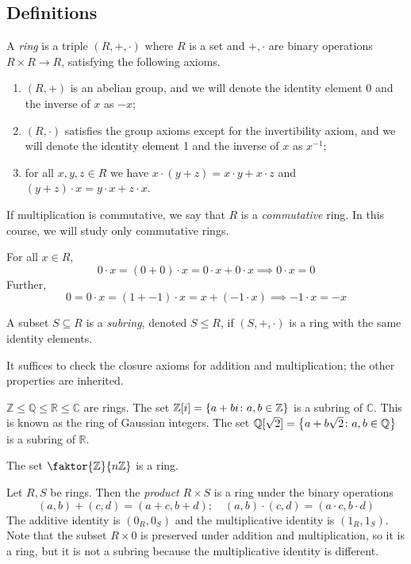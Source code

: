 \subsection{Definitions}
\begin{definition}
	A \textit{ring} is a triple \( (R, +, \cdot) \) where \( R \) is a set and \( +, \cdot \) are binary operations \( R \times R \to R \), satisfying the following axioms.
	\begin{enumerate}
		\item \( (R, +) \) is an abelian group, and we will denote the identity element 0 and the inverse of \( x \) as \( -x \);
		\item \( (R, \cdot) \) satisfies the group axioms except for the invertibility axiom, and we will denote the identity element 1 and the inverse of \( x \) as \( x^{-1} \);
		\item for all \( x, y, z \in R \) we have \( x \cdot (y+z) = x\cdot y + x\cdot z \) and \( (y+z)\cdot x = y \cdot x + z \cdot x \).
	\end{enumerate}
	If multiplication is commutative, we say that \( R \) is a \textit{commutative} ring.
	In this course, we will study only commutative rings.
\end{definition}
\begin{remark}
	For all \( x \in R \),
	\[
		0 \cdot x = (0+0) \cdot x = 0 \cdot x + 0 \cdot x \implies 0 \cdot x = 0
	\]
	Further,
	\[
		0 = 0 \cdot x = (1 + -1) \cdot x = x + (-1 \cdot x) \implies -1 \cdot x = -x
	\]
\end{remark}
\begin{definition}
	A subset \( S \subseteq R \) is a \textit{subring}, denoted \( S \leq R \), if \( (S, +, \cdot) \) is a ring with the same identity elements.
\end{definition}
\begin{remark}
	It suffices to check the closure axioms for addition and multiplication; the other properties are inherited.
\end{remark}
\begin{example}
	\( \mathbb Z \leq \mathbb Q \leq \mathbb R \leq \mathbb C \) are rings.
	The set \( \mathbb Z[i] = \qty{a+bi \colon a,b\in\mathbb Z} \) is a subring of \( \mathbb C \).
	This is known as the ring of Gaussian integers.
	The set \( \mathbb Q[\sqrt{2}] = \qty{a+b\sqrt{2} \colon a,b \in\mathbb Q} \) is a subring of \( \mathbb R \).
\end{example}
\begin{example}
	The set \( \faktor{\mathbb Z}{n\mathbb Z} \) is a ring.
\end{example}
\begin{example}
	Let \( R, S \) be rings.
	Then the \textit{product} \( R \times S \) is a ring under the binary operations
	\[
		(a,b) + (c,d) = (a+c,b+d);\quad (a,b) \cdot (c,d) = (a\cdot c,b\cdot d)
	\]
	The additive identity is \( (0_R, 0_S) \) and the multiplicative identity is \( (1_R, 1_S) \).
	Note that the subset \( R \times \qty{0} \) is preserved under addition and multiplication, so it is a ring, but it is not a subring because the multiplicative identity is different.
\end{example}

